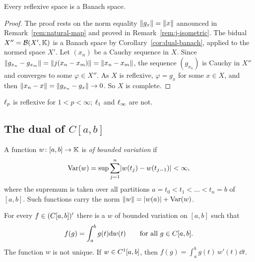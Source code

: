 \begin{proposition}\label{prop:reflexive-banach}
Every reflexive space is a Banach space.
\end{proposition}

\begin{proof}
The proof rests on the norm equality $\lVert g_x\rVert = \lVert x\rVert$ announced in
Remark~\ref{rem:natural-map} and proved in Remark~\ref{rem:j-isometric}. The bidual $X'' = \mathcal{B}(X', \mathbb{K})$ is a Banach
space by Corollary~\ref{cor:dual-banach}, applied to the normed space $X'$.
Let $(x_n)$ be a Cauchy sequence in $X$. Since
$\lVert g_{x_n} - g_{x_m}\rVert = \lVert j(x_n - x_m)\rVert = \lVert x_n - x_m\rVert$, the
sequence $(g_{x_n})$ is Cauchy in $X''$ and converges to some
$\varphi \in X''$. As $X$ is reflexive, $\varphi = g_x$ for some $x \in X$,
and then $\lVert x_n - x\rVert = \lVert g_{x_n} - g_x\rVert \to 0$. So $X$ is complete.
\end{proof}

\begin{example}\label{ex:reflexive}
$\ell_{p}$ is reflexive for $1 < p < \infty$; $\ell_{1}$ and $\ell_{\infty}$ are
not.
\end{example}

\subsection{The dual of \texorpdfstring{$C[a,b]$}{C[a,b]}}

\begin{definition}\label{def:bv}
A function $w \colon [a,b] \to \mathbb{K}$ is \emph{of bounded variation} if
\[
  \operatorname{Var}(w) = \sup \sum_{j=1}^{n} \lvert w(t_j) - w(t_{j-1})\rvert
  < \infty ,
\]
where the supremum is taken over all partitions
$a = t_0 < t_1 < \dots < t_n = b$ of $[a,b]$. Such functions carry the norm
$\lVert w\rVert = \lvert w(a)\rvert + \operatorname{Var}(w)$.
\end{definition}

\begin{theorem}[Representation of {$(C[a,b])'$}]\label{thm:dual-C}
For every $f \in (C[a,b])'$ there is a $w$ of bounded variation on
$[a,b]$ such that
\[
  f(g) = \int_a^b g(t) \mathrm{d} w(t) \qquad \text{for all } g \in C[a,b] .
\]
The function $w$ is not unique. If $w \in C^{1}[a,b]$, then
$f(g) = \int_a^b g(t)\, w'(t) \dd t$.
\end{theorem}
